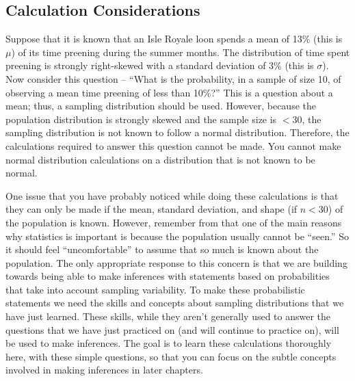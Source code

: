 \documentclass[10pt,openany]{book}\usepackage[]{graphicx}\usepackage[]{color}
\begin{document}

\subsection{Calculation Considerations}
Suppose that it is known that an Isle Royale loon spends a mean of 13\% (this is $\mu$) of its time preening during the summer months.  The distribution of time spent preening is strongly right-skewed with a standard deviation of 3\% (this is $\sigma$).  Now consider this question -- ``What is the probability, in a sample of size 10, of observing a mean time preening of less than 10\%?''  This is a question about a mean; thus, a sampling distribution should be used.  However, because the population distribution is strongly skewed and the sample size is $<30$, the sampling distribution is not known to follow a normal distribution.  Therefore, the calculations required to answer this question cannot be made.  You cannot make normal distribution calculations on a distribution that is not known to be normal.


One issue that you have probably noticed while doing these calculations is that they can only be made if the mean, standard deviation, and shape (if $n<30$) of the population is known.  However, remember from  that one of the main reasons why statistics is important is because the population usually cannot be ``seen.''  So it should feel ``uncomfortable'' to assume that so much is known about the population.  The only appropriate response to this concern is that we are building towards being able to make inferences with statements based on probabilities that take into account sampling variability.  To make these probabilistic statements we need the skills and concepts about sampling distributions that we have just learned.  These skills, while they aren't generally used to answer the questions that we have just practiced on (and will continue to practice on), will be used to make inferences.  The goal is to learn these calculations thoroughly here, with these simple questions, so that you can focus on the subtle concepts involved in making inferences in later chapters.
\end{document}
